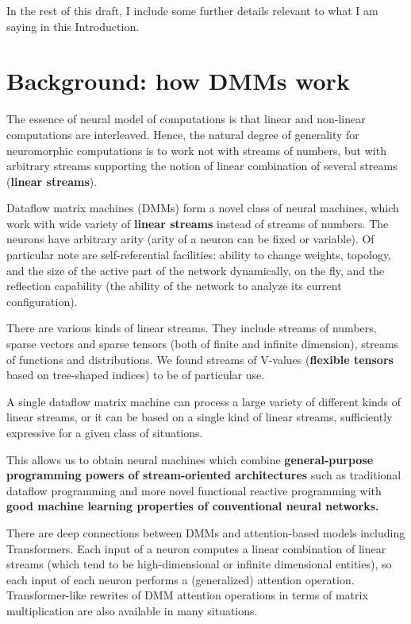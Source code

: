 \documentclass{article}
\begin{document}
In the rest of this draft, I include some further details relevant to what I am saying in this
Introduction.

\section{Background: how DMMs work}

The essence of neural model of computations is that linear and non-linear computations are interleaved. Hence, the natural
degree of generality for neuromorphic computations is to work not with streams of numbers, but with arbitrary streams
supporting the notion of linear combination of several streams ({\bf linear streams}).

Dataflow matrix machines (DMMs) form a novel class of neural machines, which work with wide variety
of {\bf linear streams} instead of streams of numbers. The neurons have
arbitrary arity (arity of a neuron can be fixed or variable). Of particular note are
self-referential facilities: ability to change weights, topology, and the size of the active part of the network dynamically, on the fly,
and the reflection capability (the ability of the network to analyze its current configuration).

There are various kinds of linear streams. They include streams of numbers, sparse vectors and sparse tensors (both of
finite and infinite dimension), streams of functions and distributions. We found streams of V-values
({\bf flexible tensors} based on tree-shaped indices) to be of particular use.

A single dataflow matrix machine can process a large variety of different kinds of linear streams, or
it can be based on a single kind of linear streams, sufficiently expressive for a given class of situations.

This allows us to obtain 
neural machines which combine {\bf general-purpose programming powers of stream-oriented
architectures} such as traditional dataflow programming and
more novel functional reactive programming with {\bf good machine learning
properties of conventional neural networks.}

There are deep connections between DMMs and attention-based models including Transformers.
Each input of a neuron computes a linear combination of linear streams (which tend to be high-dimensional
or infinite dimensional entities), so each input of each neuron performs a (generalized) attention operation.
Transformer-like rewrites of DMM attention operations in terms of matrix multiplication are also available in many situations.
\end{document}
